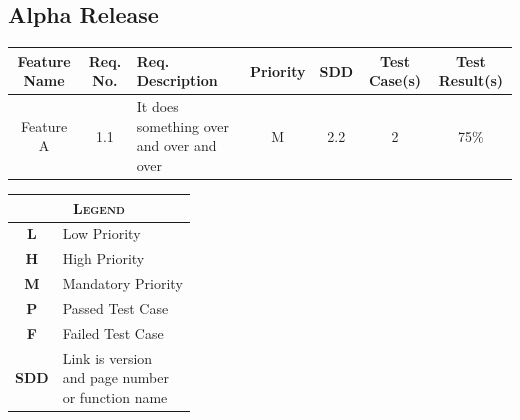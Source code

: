 \documentclass[twoside,letterpaper]{article}
\begin{document}
\subsection{Alpha Release}
\begin{minipage}{\linewidth}
\centering
{}
\begin{tabularx}{\textwidth}{*{2}{c}X*{4}{c}}\toprule[1.5pt] %

\bf Feature Name & \bf Req. No. & \bf Req. \newline Description & \bf Priority & \bf SDD & \bf Test Case(s) & \bf Test Result(s) \\ \midrule[1.0pt]

Feature A & 1.1 & It does something over and over and over & M & 2.2 & 2 & 75\% \\

\bottomrule[1.5pt]
\end{tabularx}\par

\bigskip
\raggedleft
\begin{tabular}{c l} %
\multicolumn{2}{c}{\textsc{Legend}} \\ \midrule[0.5pt]
\textsc{\textbf{L}}   & Low Priority\\
\textsc{\textbf{H}}   & High Priority\\
\textsc{\textbf{M}}	  & Mandatory Priority\\
\textsc{\textbf{P}}   & Passed Test Case\\
\textsc{\textbf{F}}   & Failed Test Case\\
\textsc{\textbf{SDD}} & \parbox{3cm}{\vspace{.25em}
						Link is version\\
						and page number\\
						or function name}
\end{tabular}
\end{minipage}
\end{document}
